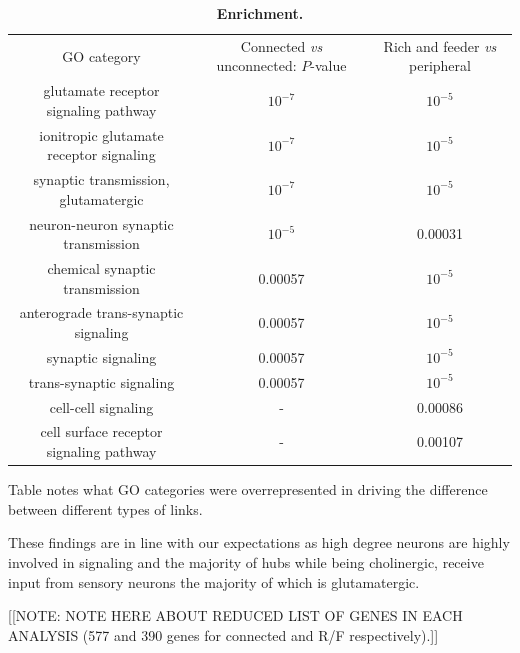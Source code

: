 \documentclass[10pt,letterpaper]{article}
\newlength\savedwidth
\newcommand\thickhline{\noalign{\global\savedwidth\arrayrulewidth\global\arrayrulewidth 2pt}%
\hline
\noalign{\global\arrayrulewidth\savedwidth}}
\begin{document}
\begin{table}[t]
\begin{adjustwidth}{-2.25in}{0in} %
\centering
\caption{
{\bf Enrichment.}}
\begin{tabular}{ |c|c|c| }
\thickhline
GO category  		& Connected \textit{vs} unconnected: $P$-value  	& Rich and feeder \textit{vs} peripheral      \\ \thickhline
glutamate receptor signaling pathway      	& $10^{-7}$      		&  $10^{-5}$\\ \hline
ionitropic glutamate receptor signaling     & $10^{-7}$      		&  $10^{-5}$ \\ \hline
synaptic transmission, glutamatergic      	& $10^{-7}$     			&  $10^{-5}$ \\ \hline
neuron-neuron synaptic transmission          & $10^{-5}$     			&  0.00031\\ \hline
chemical synaptic transmission               & 0.00057      			&  $10^{-5}$\\ \hline
anterograde trans-synaptic signaling      	& 0.00057      			&  $10^{-5}$\\ \hline
synaptic signaling                          & 0.00057      			&  $10^{-5}$\\ \hline
trans-synaptic signaling                    & 0.00057      			&  $10^{-5}$ \\ \hline
cell-cell signaling                         &      -           		&  0.00086 \\ \hline
cell surface receptor signaling pathway     &       -          		&  0.00107 \\ \hline
\end{tabular}
\begin{flushleft} Table notes what GO categories were overrepresented in driving the difference between different types of links.
\end{flushleft}
\label{table1}
\end{adjustwidth}
\end{table}

These findings are in line with our expectations as high degree neurons are highly involved in signaling and the majority of hubs while being cholinergic, receive input from sensory neurons the majority of which is glutamatergic.

[[NOTE: NOTE HERE ABOUT REDUCED LIST OF GENES IN EACH ANALYSIS (577 and 390 genes for connected and R/F respectively).]]
\end{document}
